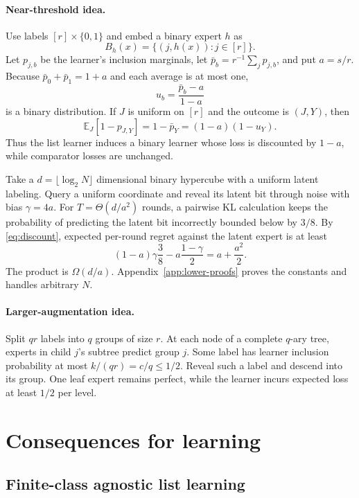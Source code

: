 \documentclass{article}
\theoremstyle{definition}
\theoremstyle{remark}
\newcommand{\E}{\mathbb E}
\newcommand{\1}{\mathbf 1}
\begin{document}
\paragraph{Near-threshold idea.}
Use labels \([r]\times\{0,1\}\) and embed a binary expert \(h\) as \[ B_h(x)=\{(j,h(x)):j\in[r]\}. \] Let \(p_{j,b}\) be the learner's inclusion marginals, let \(\bar p_b=r^{-1}\sum_jp_{j,b}\), and put \(a=s/r\). Because \(\bar p_0+\bar p_1=1+a\) and each average is at most one, \[ u_b=\frac{\bar p_b-a}{1-a} \] is a binary distribution. If \(J\) is uniform on \([r]\) and the outcome is \((J,Y)\), then
\begin{equation}
\label{eq:discount}
\E_J[1-p_{J,Y}]
=1-\bar p_Y
=(1-a)(1-u_Y).
\end{equation}
Thus the list learner induces a binary learner whose loss is discounted by \(1-a\), while comparator losses are unchanged.

Take a \(d=\lfloor\log_2N\rfloor\) dimensional binary hypercube with a uniform latent labeling. Query a uniform coordinate and reveal its latent bit through noise with bias \(\gamma=4a\). For \(T=\Theta(d/a^2)\) rounds, a pairwise KL calculation keeps the probability of predicting the latent bit incorrectly bounded below by \(3/8\). By \eqref{eq:discount}, expected per-round regret against the latent expert is at least \[ (1-a)\gamma\frac38-a\frac{1-\gamma}{2} =a+\frac{a^2}{2}. \] The product is \(\Omega(d/a)\). Appendix~\ref{app:lower-proofs} proves the constants and handles arbitrary \(N\).

\paragraph{Larger-augmentation idea.}
Split \(qr\) labels into \(q\) groups of size \(r\). At each node of a complete \(q\)-ary tree, experts in child \(j\)'s subtree predict group \(j\). Some label has learner inclusion probability at most \(k/(qr)=c/q\le1/2\). Reveal such a label and descend into its group. One leaf expert remains perfect, while the learner incurs expected loss at least \(1/2\) per level.

\section{Consequences for learning}
\label{sec:consequences}

\subsection{Finite-class agnostic list learning}
\end{document}
